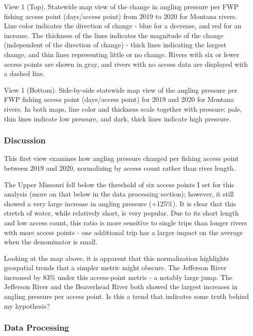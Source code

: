 \documentclass[11pt]{article}
\begin{document}
    View 1 (Top). Statewide map view of the change in angling pressure per
FWP fishing access point (days/access point) from 2019 to 2020 for
Montana rivers. Line color indicates the direction of change - blue for
a decrease, and red for an increase. The thickness of the lines
indicates the magnitude of the change (independent of the direction of
change) - thick lines indicating the largest change, and thin lines
representing little or no change. Rivers with six or fewer access points
are shown in gray, and rivers with no access data are displayed with a
dashed line.

View 1 (Bottom). Side-by-side statewide map view of the angling pressure
per FWP fishing access point (days/access point) for 2019 and 2020 for
Montana rivers. In both maps, line color and thickness scale together
with pressure: pale, thin lines indicate low pressure, and dark, thick
lines indicate high pressure.

    \hypertarget{discussion}{%
\subsubsection{Discussion}\label{discussion}}

This first view examines how angling pressure changed per fishing access
point between 2019 and 2020, normalizing by access count rather than
river length.

The Upper Missouri fell below the threshold of six access points I set
for this analysis (more on that below in the data processing section);
however, it still showed a very large increase in angling pressure
(+125\%). It is clear that this stretch of water, while relatively
short, is very popular. Due to its short length and low access count,
this ratio is more sensitive to single trips than longer rivers with
more access points - one additional trip has a larger impact on the
average when the denominator is small.

Looking at the map above, it is apparent that this normalization
highlights geospatial trends that a simpler metric might obscure. The
Jefferson River increased by 83\% under this access-point metric - a
notably large jump. The Jefferson River and the Beaverhead River both
showed the largest increases in angling pressure per access point. Is
this a trend that indicates some truth behind my hypothesis?

    \hypertarget{data-processing}{%
\subsubsection{Data Processing}\label{data-processing}}
\end{document}
